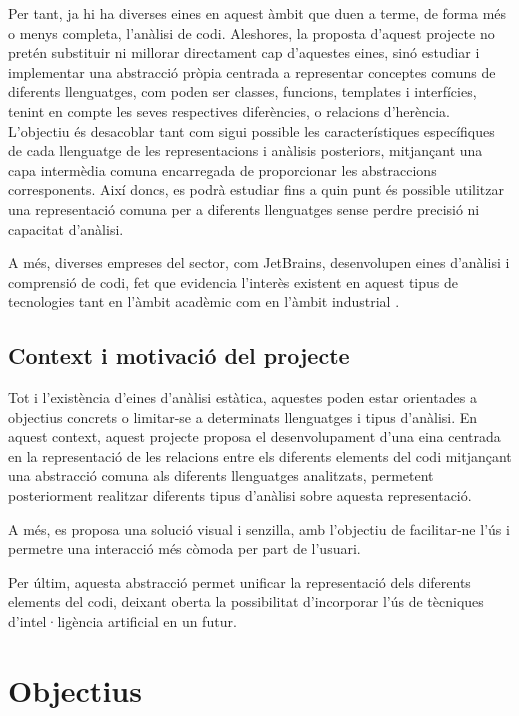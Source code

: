 Per tant, ja hi ha diverses eines en aquest àmbit que duen a terme, de forma més o menys completa, l'anàlisi de codi. Aleshores, la proposta d'aquest projecte no pretén substituir ni millorar directament cap d'aquestes eines, sinó estudiar i implementar una abstracció pròpia centrada a representar conceptes comuns de diferents llenguatges, com poden ser classes, funcions, templates i interfícies, tenint en compte les seves respectives diferències, o relacions d'herència. L'objectiu és desacoblar tant com sigui possible les característiques específiques de cada llenguatge de les representacions i anàlisis posteriors, mitjançant una capa intermèdia comuna encarregada de proporcionar les abstraccions corresponents. Així doncs, es podrà estudiar fins a quin punt és possible utilitzar una representació comuna per a diferents llenguatges sense perdre precisió ni capacitat d'anàlisi.

A més, diverses empreses del sector, com JetBrains, desenvolupen eines d'anàlisi i comprensió de codi, fet que evidencia l'interès existent en aquest tipus de tecnologies tant en l'àmbit acadèmic com en l'àmbit industrial \cite{jetbrains_inspectopedia}.


\subsection*{Context i motivació del projecte}
Tot i l'existència d'eines d'anàlisi estàtica, aquestes poden estar orientades a objectius concrets o limitar-se a determinats llenguatges i tipus d'anàlisi. En aquest context, aquest projecte proposa el desenvolupament d'una eina centrada en la representació de les relacions entre els diferents elements del codi mitjançant una abstracció comuna als diferents llenguatges analitzats, permetent posteriorment realitzar diferents tipus d'anàlisi sobre aquesta representació.

A més, es proposa una solució visual i senzilla, amb l'objectiu de facilitar-ne l'ús i permetre una interacció més còmoda per part de l'usuari.

Per últim, aquesta abstracció permet unificar la representació dels diferents elements del codi, deixant oberta la possibilitat d'incorporar l'ús de tècniques d'intel·ligència artificial en un futur.


\section*{Objectius}

